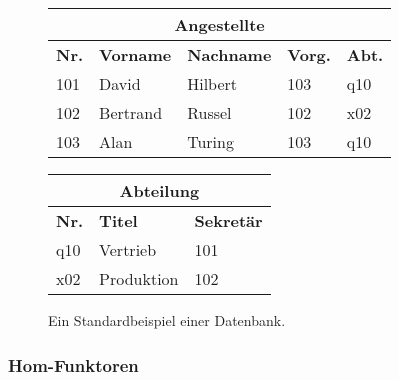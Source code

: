 \documentclass[a4paper,ngerman]{scrartcl}
\theoremstyle{definition}
\theoremstyle{plain}
\theoremstyle{remark}
\begin{document}
\begin{figure}
  \begin{center}
    \small
    \begin{tabular}{|l||l|l|l|l|}
      \hline
      \multicolumn{5}{|c|}{Angestellte} \\ \hline
      \textbf{Nr.} & \textbf{Vorname} & \textbf{Nachname} & \textbf{Vorg.} & \textbf{Abt.} \\ \hline
      101 & David & Hilbert & 103 & q10 \\
      102 & Bertrand & Russel & 102 & x02 \\
      103 & Alan & Turing & 103 & q10 \\
      \hline
    \end{tabular}
    \quad
    \begin{tabular}{|l||l|l|}
      \hline
      \multicolumn{3}{|c|}{Abteilung} \\ \hline
      \textbf{Nr.} & \textbf{Titel} & \textbf{Sekretär} \\ \hline
      q10 & Vertrieb & 101 \\
      x02 & Produktion & 102 \\
      \hline
    \end{tabular}
  \end{center}

  \caption{\label{db0815}Ein Standardbeispiel einer Datenbank.}
\end{figure}

\subsubsection{Hom-Funktoren}
\end{document}
